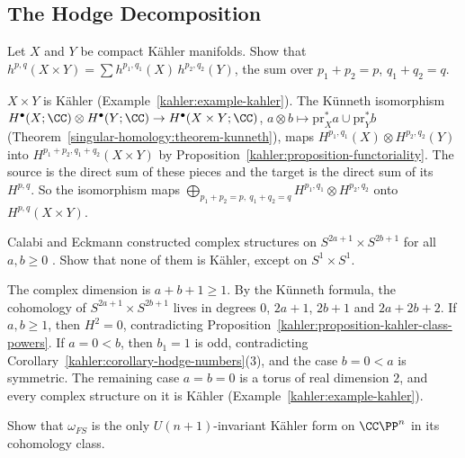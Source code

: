 \subsection{The Hodge Decomposition}\label{kahler:subsection-exercises-hodge-decomposition}

\begin{exercise}\label{kahler:exercise-kunneth-hodge}
Let $X$ and $Y$ be compact K\"ahler manifolds. Show that
$h^{p,q}(X \times Y) = \sum h^{p_1,q_1}(X)\,h^{p_2,q_2}(Y)$, the sum over $p_1 + p_2 = p$, $q_1 + q_2 = q$.
\end{exercise}

\begin{solution}
$X \times Y$ is K\"ahler (Example~\ref{kahler:example-kahler}). The K\"unneth isomorphism
$H^\bullet(X; \CC) \otimes H^\bullet(Y; \CC) \to H^\bullet(X \times Y; \CC)$, $a \otimes b \mapsto \mathrm{pr}_X^*a \cup \mathrm{pr}_Y^*b$
(Theorem~\ref{singular-homology:theorem-kunneth}), maps $H^{p_1,q_1}(X) \otimes H^{p_2,q_2}(Y)$ into $H^{p_1+p_2,q_1+q_2}(X \times Y)$ by
Proposition~\ref{kahler:proposition-functoriality}. The source is the direct sum of these pieces and the target is the direct
sum of its $H^{p,q}$. So the isomorphism maps $\bigoplus_{p_1+p_2=p,\ q_1+q_2=q}H^{p_1,q_1} \otimes H^{p_2,q_2}$ onto $H^{p,q}(X \times Y)$.
\end{solution}

\begin{exercise}\label{kahler:exercise-calabi-eckmann}
Calabi and Eckmann constructed complex structures on $S^{2a+1} \times S^{2b+1}$ for all $a, b \geq 0$ \cite{calabi-eckmann}. Show that none
of them is K\"ahler, except on $S^1 \times S^1$.
\end{exercise}

\begin{solution}
The complex dimension is $a + b + 1 \geq 1$. By the K\"unneth formula, the cohomology of $S^{2a+1} \times S^{2b+1}$ lives in degrees
$0$, $2a + 1$, $2b + 1$ and $2a + 2b + 2$. If $a, b \geq 1$, then $H^2 = 0$, contradicting
Proposition~\ref{kahler:proposition-kahler-class-powers}. If $a = 0 < b$, then $b_1 = 1$ is odd, contradicting
Corollary~\ref{kahler:corollary-hodge-numbers}(3), and the case $b = 0 < a$ is symmetric. The remaining case $a = b = 0$ is a
torus of real dimension $2$, and every complex structure on it is K\"ahler (Example~\ref{kahler:example-kahler}).
\end{solution}

\begin{exercise}\label{kahler:exercise-invariant-fubini-study}
Show that $\omega_{FS}$ is the only $U(n+1)$-invariant K\"ahler form on $\CC\PP^n$ in its cohomology class.
\end{exercise}

